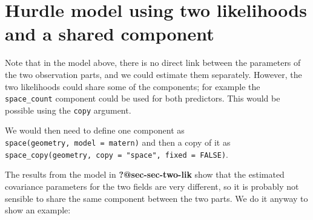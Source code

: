 \documentclass[
  letterpaper,
  DIV=11,
  numbers=noendperiod]{scrartcl}
\begin{document}
\section{Hurdle model using two likelihoods and a shared
component}\label{sec-two-lik-share}

Note that in the model above, there is no direct link between the
parameters of the two observation parts, and we could estimate them
separately. However, the two likelihoods could share some of the
components; for example the \texttt{space\_count} component could be
used for both predictors. This would be possible using the \texttt{copy}
argument.

We would then need to define one component as
\texttt{space(geometry,\ model\ =\ matern)} and then a copy of it as
\texttt{space\_copy(geometry,\ copy\ =\ "space",\ fixed\ =\ FALSE)}.

The results from the model in \textbf{?@sec-sec-two-lik} show that the
estimated covariance parameters for the two fields are very different,
so it is probably not sensible to share the same component between the
two parts. We do it anyway to show an example:
\end{document}
